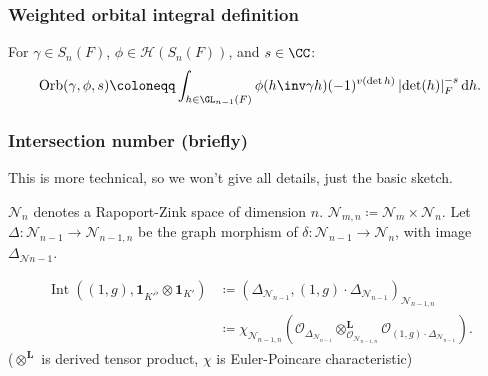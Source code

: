 \documentclass[11pt]{beamer}
\DeclareMathOperator{\Int}{Int}
\DeclareMathOperator{\Orb}{Orb}
\DeclareMathOperator{\U}{U}
\newcommand{\HH}{\mathcal{H}}
\newcommand{\VV}{\mathbb{V}}
\newcommand{\RZ}{\mathcal{N}}
\newcommand{\Sheaf}{\mathcal O}
\newcommand{\jiao}{\mathop{\otimes}^{\mathbf{L}}} %
\begin{document}
\begin{frame}
  \frametitle{Weighted orbital integral definition}
  For $\gamma \in S_n(F)$, $\phi \in \HH(S_n(F))$, and $s \in \CC$:
  \[ \Orb(\gamma, \phi, s) \coloneqq
    \int_{h \in \GL_{n-1}(F)} \phi(h\inv \gamma h) (-1)^{v(\det h)}
    \left\lvert \det(h) \right\rvert_F^{-s} \odif h. \]
\end{frame}

\begin{frame}
  \frametitle{Intersection number (briefly)}
  This is more technical, so we won't give all details, just the basic sketch.
  \begin{itemize}
    \ii $\RZ_n$ denotes a Rapoport-Zink space of dimension $n$.
    \ii $\RZ_{m,n} \coloneqq \RZ_m \times \RZ_n$.
    \ii Let $\Delta: \RZ_{n-1} \to \RZ_{n-1,n}$
    be the graph morphism of $\delta \colon \RZ_{n-1} \to \RZ_n$,
    with image $\Delta_{\RZ{n-1}}$.
  \end{itemize}
  \begin{definition}
    \begin{align*}
      \Int((1,g), \mathbf{1}_{K'^\flat} \otimes \mathbf{1}_{K'})
      &\coloneqq \left( \Delta_{\RZ_{n-1}}, (1,g) \cdot \Delta_{\RZ_{n-1}} \right)_{\RZ_{n-1,n}} \\
      &\coloneqq \chi_{\RZ_{n-1,n}}
      \left( \Sheaf_{\Delta_{\RZ_{n-1}}} \jiao_{\Sheaf_{\RZ_{n-1,n}}} \Sheaf_{(1,g) \cdot \Delta_{\RZ_{n-1}}} \right) .
    \end{align*}
    ($\jiao$ is derived tensor product, $\chi$ is Euler-Poincare characteristic)
  \end{definition}
\end{frame}
\end{document}
